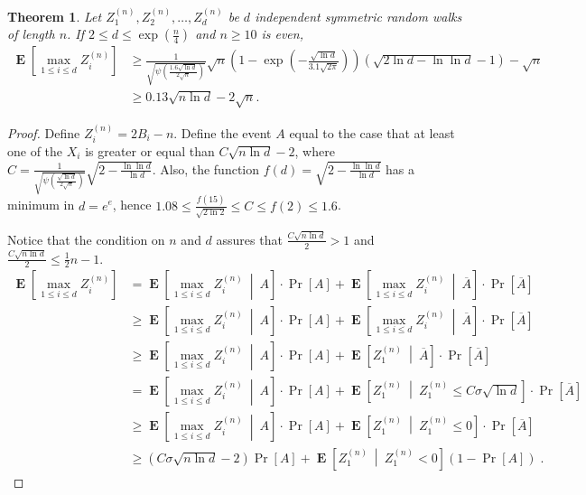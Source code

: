 \documentclass{article}
\DeclareMathOperator*{\Exp}{\mathbf{E}}
\newtheorem{theorem}{Theorem}
\begin{document}
\begin{theorem}
\label{theorem:maximum-of-random-walks}
Let $Z^{(n)}_1, Z^{(n)}_2, \dots, Z^{(n)}_d$ be $d$ independent symmetric random walks of length $n$. If $2 \le d \le \exp(\frac{n}{4})$ and $n\ge 10$ is even,
\begin{align*}
\Exp \left[ \max_{1 \le i \le d} Z^{(n)}_i \right]
& \ge \frac{1}{\sqrt{\psi\left(\frac{1.6\sqrt{\ln d}}{2 \sqrt{n}}\right)}}\sqrt{n}\left(1 - \exp\left(-\frac{\sqrt{\ln d}}{3.1 \sqrt{2\pi}}\right)\right) \left(\sqrt{2 \ln d -\ln \ln d}-1\right) -\sqrt{n} \\
& \ge 0.13 \sqrt{n \ln d} - 2 \sqrt{n}.
\end{align*}
\end{theorem}

\begin{proof}
Define $Z^{(n)}_i = 2 B_i-n$.  Define the event $A$ equal to the case that at least
one of the $X_i$ is greater or equal than $C \sqrt{n \ln d}-2$, where
$C=\frac{1}{\sqrt{\psi\left(\frac{\sqrt{\ln d}}{2
\sqrt{n}}\right)}}\sqrt{2-\frac{\ln \ln d}{\ln d}}$. Also, the function
$f(d)=\sqrt{2-\frac{\ln \ln d}{\ln d}}$ has a minimum in $d=e^e$, hence
$1.08 \le \frac{f(15)}{\sqrt{2 \ln 2}} \le C\le f(2)\le 1.6$.

Notice that the condition on $n$ and $d$ assures that $\frac{C \sqrt{n \ln d}}{2}>1$ and $\frac{C \sqrt{n \ln d}}{2}\le \frac{1}{2} n - 1$.
\begin{align*}
\Exp \left[ \max_{1 \le i \le d} Z^{(n)}_i \right]
& = \Exp \left[ \max_{1 \le i \le d} Z^{(n)}_i ~ \middle|~ A \right] \cdot \Pr[A] + \Exp \left[ \max_{1 \le i \le d} Z^{(n)}_i ~\middle|~ \overline{A} \right] \cdot \Pr \left[ \overline{A} \right] \\
& \ge \Exp \left[ \max_{1 \le i \le d} Z^{(n)}_i ~\middle|~ A \right] \cdot \Pr[A] + \Exp \left[ \max_{1 \le i \le d} Z^{(n)}_i ~\middle|~ \overline{A} \right] \cdot \Pr \left[ \overline{A} \right]\\
& \ge \Exp \left[ \max_{1 \le i \le d} Z^{(n)}_i ~\middle|~ A \right] \cdot \Pr[A] + \Exp\left[ Z^{(n)}_1 ~\middle|~ \overline{A} \right] \cdot \Pr \left[ \overline{A} \right] \\
& = \Exp \left[ \max_{1 \le i \le d} Z^{(n)}_i ~\middle|~ A \right] \cdot \Pr[A] + \Exp \left[ Z^{(n)}_1 ~\middle|~ Z^{(n)}_1 \le C \sigma \sqrt{\ln d} \right] \cdot \Pr \left[ \overline{A} \right]\\
& \ge \Exp \left[ \max_{1 \le i \le d} Z^{(n)}_i ~\middle|~ A \right] \cdot \Pr[A] + \Exp \left[ Z^{(n)}_1 ~\middle|~ Z^{(n)}_1 \le 0 \right] \cdot \Pr \left[ \overline{A} \right] \\
& \ge (C \sigma \sqrt{n \ln d} - 2) \Pr[A] + \Exp \left[ Z^{(n)}_1 ~\middle|~ Z^{(n)}_1 < 0 \right] (1 - \Pr[A]) \; .
\end{align*}


\end{proof}
\end{document}
